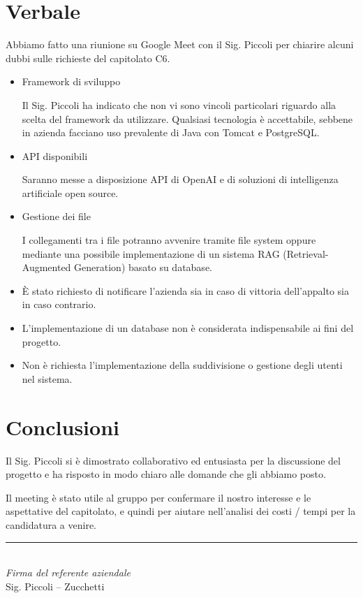 \documentclass[a4paper,10pt]{article}
\begin{document}
\section*{Verbale}
Abbiamo fatto una riunione su Google Meet con il Sig. Piccoli per chiarire alcuni dubbi sulle richieste del capitolato C6.

\vspace{1\baselineskip}

\begin{itemize}
    \item Framework di sviluppo
    \par Il Sig. Piccoli ha indicato che non vi sono vincoli particolari riguardo alla scelta del framework da utilizzare. Qualsiasi tecnologia è accettabile, sebbene in azienda facciano uso prevalente di Java con Tomcat e PostgreSQL.
    \item API disponibili
    \par Saranno messe a disposizione API di OpenAI e di soluzioni di intelligenza artificiale open source.
    \item Gestione dei file
    \par I collegamenti tra i file potranno avvenire tramite file system oppure mediante una possibile implementazione di un sistema RAG (Retrieval-Augmented Generation) basato su database.
    \item È stato richiesto di notificare l’azienda sia in caso di vittoria dell’appalto sia in caso contrario.
    \item L’implementazione di un database non è considerata indispensabile ai fini del progetto.
    \item Non è richiesta l’implementazione della suddivisione o gestione degli utenti nel sistema.
\end{itemize}

\vspace{1\baselineskip}

\section*{Conclusioni}
Il Sig. Piccoli si è dimostrato collaborativo ed entusiasta per la discussione del progetto e ha risposto in modo chiaro alle domande che gli abbiamo posto.

\vspace{1\baselineskip}

Il meeting è stato utile al gruppo per confermare il nostro interesse e le aspettative del capitolato, e quindi per aiutare nell'analisi dei costi / tempi per la candidatura a venire.

\vspace{2cm}
\begin{flushright}
\noindent\rule{6cm}{0.4pt}\\
\textit{Firma del referente aziendale}\\
Sig. Piccoli – Zucchetti
\end{flushright}
\end{document}
